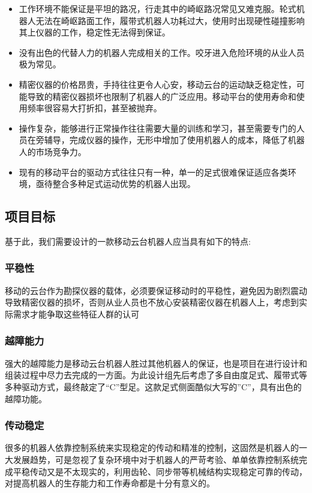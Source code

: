 \documentclass[12pt]{article}
\begin{document}
\begin{CJK}{UTF8}{gbsn}
\begin{itemize}
\item 工作环境不能保证是平坦的路况，行走其中的崎岖路况常见又难克服。轮式机器人无法在崎岖路面工作，履带式机器人功耗过大，使用时出现硬性碰撞影响其上仪器的工作，稳定性无法得到保证。
\item 没有出色的代替人力的机器人完成相关的工作。咬牙进入危险环境的从业人员极为常见。
\item 精密仪器的价格昂贵，手持往往更令人心安，移动云台的运动缺乏稳定性，可能导致的精密仪器损坏也限制了机器人的广泛应用。移动平台的使用寿命和使用频率很容易大打折扣，甚至被抛弃。
\item 操作复杂，能够进行正常操作往往需要大量的训练和学习，甚至需要专门的人员在旁辅导，完成仪器的操作，无形中增加了使用机器人的成本，降低了机器人的市场竞争力。
\item 现有的移动平台的驱动方式往往只有一种，单一的足式很难保证适应各类环境，亟待整合多种足式运动优势的机器人出现。

\end{itemize}



\subsection{项目目标}
\label{sec:features}
基于此，我们需要设计的一款移动云台机器人应当具有如下的特点:

\subsubsection{平稳性}
\label{sec:requirements}
移动的云台作为勘探仪器的载体，必须要保证移动时的平稳性，避免因为剧烈震动导致精密仪器的损坏，否则从业人员也不放心安装精密仪器在机器人上，考虑到实际需求才能争取这些特征人群的认可

\subsubsection{越障能力}
\label{sec:layout}
强大的越障能力是移动云台机器人胜过其他机器人的保证，也是项目在进行设计和组装过程中尽力去完成的一方面。为此设计组先后考虑了多自由度足式、履带式等多种驱动方式，最终敲定了“C”型足。这款足式侧面酷似大写的”C”，具有出色的越障功能。

\subsubsection{传动稳定}
\label{sec:format}

很多的机器人依靠控制系统来实现稳定的传动和精准的控制，这固然是机器人的一大发展趋势，可是忽视了复杂环境中对于机器人的严苛考验、单单依靠控制系统完成平稳传动又是不太现实的，利用齿轮、同步带等机械结构实现稳定可靠的传动，对提高机器人的生存能力和工作寿命都是十分有意义的。

\end{CJK}
\end{document}
